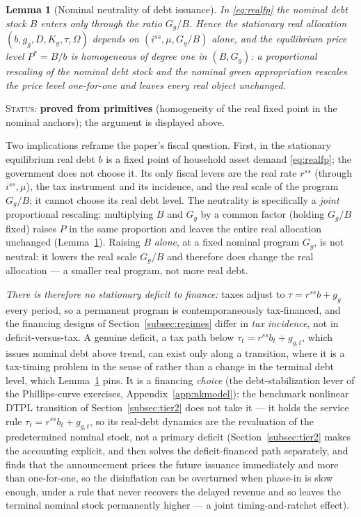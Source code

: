 \documentclass[12pt]{article}
\newtheorem{lemma}{Lemma}
\begin{document}
\begin{lemma}[Nominal neutrality of debt issuance]\label{lem:neutrality}
In \eqref{eq:realfp} the nominal debt stock $B$ enters only through the
ratio $G_g/B$. Hence the stationary real allocation
$(b,g_g,D,K_g,\tau,\Omega)$ depends on $(i^{ss},\mu,G_g/B)$ alone, and the
equilibrium price level $P^{*}=B/b$ is homogeneous of degree one in
$(B,G_g)$: a proportional rescaling of the nominal debt stock and the
nominal green appropriation rescales the price level one-for-one and leaves
every real object unchanged.
\end{lemma}
\noindent\textsc{Status:} \textbf{proved from primitives} (homogeneity of the
real fixed point in the nominal anchors); the argument is displayed above.

Two implications reframe the paper's fiscal question. First, in the
stationary equilibrium real debt $b$ is a fixed point of household asset
demand \eqref{eq:realfp}; the government does not choose it. Its only
fiscal levers are the real rate $r^{ss}$ (through $i^{ss},\mu$), the tax
instrument and its incidence, and the real scale of the program $G_g/B$; it
cannot choose its real debt level. The neutrality is specifically a
\emph{joint} proportional rescaling: multiplying $B$ and $G_g$ by a common
factor (holding $G_g/B$ fixed) raises $P$ in the same proportion and leaves
the entire real allocation unchanged (Lemma~\ref{lem:neutrality}). Raising
$B$ \emph{alone}, at a fixed nominal program $G_g$, is not neutral:
it lowers the real scale $G_g/B$ and therefore does change the real
allocation --- a smaller real program, not more real debt.

\emph{There
is therefore no stationary deficit to finance:} taxes adjust to
$\tau=r^{ss}b+g_g$ every period, so a permanent program is
contemporaneously tax-financed, and the financing designs of
Section~\ref{subsec:regimes} differ in \emph{tax incidence}, not in
deficit-versus-tax. A genuine deficit, a tax path below
$\tau_t=r^{ss}b_t+g_{g,t}$, which issues nominal debt above trend, can exist
only along a transition, where it is a tax-timing problem in the
sense of \citet{angeletos2024deficits} rather than a change in the terminal
debt level, which Lemma~\ref{lem:neutrality} pins. It is a financing
\emph{choice} (the debt-stabilization lever of the Phillips-curve exercises,
Appendix~\ref{app:nkmodel}); the benchmark nonlinear DTPL transition of
Section~\ref{subsec:tier2} does not take it --- it holds the service rule
$\tau_t=r^{ss}b_t+g_{g,t}$, so its real-debt dynamics are the revaluation
of the predetermined nominal stock, not a primary deficit
(Section~\ref{subsec:tier2} makes the accounting explicit, and then solves
the deficit-financed path separately, and finds that the announcement
prices the future issuance immediately and more than one-for-one, so the
disinflation can be overturned when phase-in is slow enough, under a rule
that never recovers the delayed revenue and so leaves the terminal nominal
stock permanently higher --- a joint timing-and-ratchet effect).
\end{document}
